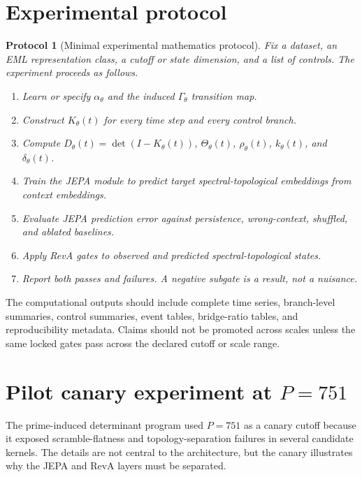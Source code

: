 \documentclass[11pt]{article}
\newtheorem{protocol}{Protocol}
\begin{document}
\section{Experimental protocol}
\begin{protocol}[Minimal experimental mathematics protocol]
Fix a dataset, an EML representation class, a cutoff or state dimension, and a list of controls. The experiment proceeds as follows.
\begin{enumerate}
\item Learn or specify $\alpha_\theta$ and the induced $\Gamma_\theta$ transition map.
\item Construct $K_\theta(t)$ for every time step and every control branch.
\item Compute $D_\theta(t)=\det(I-K_\theta(t))$, $\Theta_\theta(t)$, $\rho_\theta(t)$, $k_\theta(t)$, and $\delta_\theta(t)$.
\item Train the JEPA module to predict target spectral-topological embeddings from context embeddings.
\item Evaluate JEPA prediction error against persistence, wrong-context, shuffled, and ablated baselines.
\item Apply RevA gates to observed and predicted spectral-topological states.
\item Report both passes and failures. A negative subgate is a result, not a nuisance.
\end{enumerate}
\end{protocol}

The computational outputs should include complete time series, branch-level summaries, control summaries, event tables, bridge-ratio tables, and reproducibility metadata. Claims should not be promoted across scales unless the same locked gates pass across the declared cutoff or scale range.

\section{Pilot canary experiment at $P=751$}
The prime-induced determinant program used $P=751$ as a canary cutoff because it exposed scramble-flatness and topology-separation failures in several candidate kernels. The details are not central to the architecture, but the canary illustrates why the JEPA and RevA layers must be separated.
\end{document}
